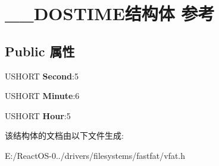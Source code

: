 \hypertarget{struct_____d_o_s_t_i_m_e}{}\section{\+\_\+\+\_\+\+D\+O\+S\+T\+I\+M\+E结构体 参考}
\label{struct_____d_o_s_t_i_m_e}
\subsection*{Public 属性}
\begin{DoxyCompactItemize}
\item 
\mbox{\label{struct_____d_o_s_t_i_m_e_aadfc242ccfb5e3621a04d9d77a2579b6}} 
U\+S\+H\+O\+RT {\bfseries Second}\+:5
\item 
\mbox{\label{struct_____d_o_s_t_i_m_e_aed9660b3828296c854fea0176160ed74}} 
U\+S\+H\+O\+RT {\bfseries Minute}\+:6
\item 
\mbox{\label{struct_____d_o_s_t_i_m_e_ab7b5e9e4583049bb74afea1574539afd}} 
U\+S\+H\+O\+RT {\bfseries Hour}\+:5
\end{DoxyCompactItemize}


该结构体的文档由以下文件生成\+:\begin{DoxyCompactItemize}
\item 
E\+:/\+React\+O\+S-\/0../drivers/filesystems/fastfat/vfat.\+h\end{DoxyCompactItemize}
